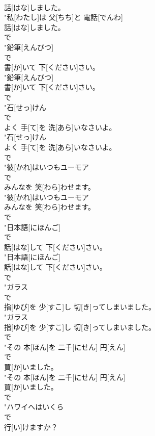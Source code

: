 \documentclass[8pt]{extreport}
\begin{document}
\begin{CJK}{UTF8}{min}
\\	話[はな]しました。
\\	"私[わたし]は 父[ちち]と 電話[でんわ]
\\	話[はな]しました。
\\	で
\\	"鉛筆[えんぴつ]
\\	で
\\	書[か]いて 下[ください]さい。
\\	"鉛筆[えんぴつ]
\\	書[か]いて 下[ください]さい。
\\	で
\\	"石[せっ]けん
\\	で
\\	よく 手[て]を 洗[あら]いなさいよ。
\\	"石[せっ]けん
\\	よく 手[て]を 洗[あら]いなさいよ。
\\	で
\\	"彼[かれ]はいつもユーモア
\\	で
\\	みんなを 笑[わら]わせます。
\\	"彼[かれ]はいつもユーモア
\\	みんなを 笑[わら]わせます。
\\	で
\\	"日本語[にほんご]
\\	で
\\	話[はな]して 下[ください]さい。
\\	"日本語[にほんご]
\\	話[はな]して 下[ください]さい。
\\	で
\\	"ガラス
\\	で
\\	指[ゆび]を 少[すこ]し 切[き]ってしまいました。
\\	"ガラス
\\	指[ゆび]を 少[すこ]し 切[き]ってしまいました。
\\	で
\\	"その 本[ほん]を 二千[にせん] 円[えん]
\\	で
\\	買[か]いました。
\\	"その 本[ほん]を 二千[にせん] 円[えん]
\\	買[か]いました。
\\	で
\\	"ハワイへはいくら
\\	で
\\	行[い]けますか？

\end{CJK}
\end{document}
